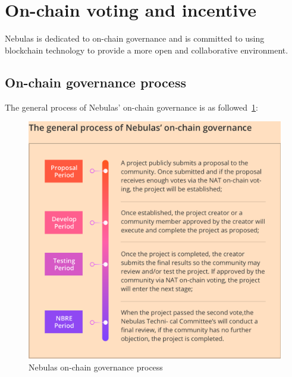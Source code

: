 \section{On-chain voting and incentive}

Nebulas is dedicated to on-chain governance and is committed to using blockchain technology to provide a more open and collaborative environment.

\subsection{On-chain governance process}
\label{governance}

The general process of Nebulas' on-chain governance is as followed~\ref{fig:on-chain-governance}:

\begin{figure}
	\centering
	\includegraphics[width=1\textwidth]{../common/en/on-chain-governance.png}
	\caption{Nebulas on-chain governance process \label{fig:on-chain-governance}}
\end{figure}

